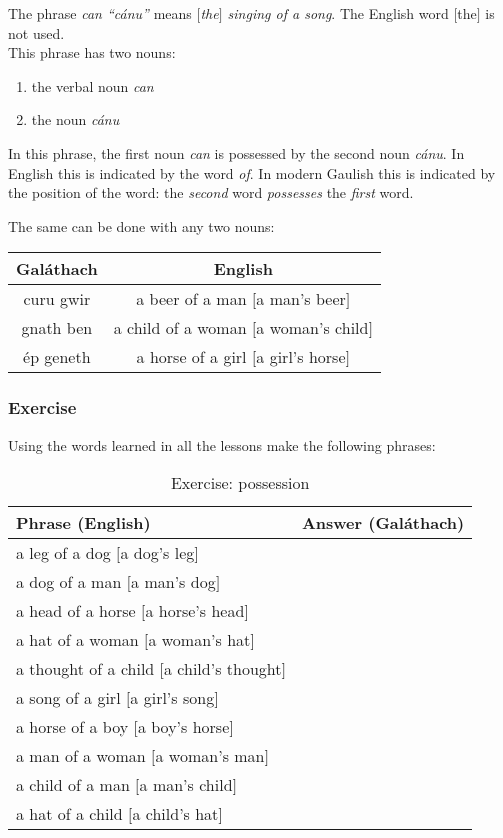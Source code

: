 The phrase \textit{can ``c\'{a}nu''} means \textit{$[$the$]$ singing of a song}. The English word $[$the$]$ is not used.\\

This phrase has two nouns:
\begin{enumerate}
 \item{the verbal noun \textit{can}}
 \item{the noun \textit{c\'{a}nu}}
\end{enumerate}
In this phrase, the first noun \textit{can} is possessed by the second noun \textit{c\'{a}nu}. In English this is indicated by the word \textit{of}. In modern Gaulish this is indicated by the position of the word: the \textit{second} word \textit{possesses} the \textit{first} word.

The same can be done with any two nouns:
\begin{table}[H]
\centering
\begin{tabu}{c|c}
  \textbf{Gal\'{a}thach} & \textbf{English}\\
  \toprule
  curu gwir & a beer of a man $[$a man's beer$]$\\
  gnath ben & a child of a woman $[$a woman's child$]$\\
  \'{e}p geneth & a horse of a girl $[$a girl's horse$]$
\end{tabu}
\label{examples_possession_word_position}
\end{table}

\newpage
\subsubsection{Exercise}

Using the words learned in all the lessons make the following phrases:
\begin{table}[H]
\centering
\begin{tabu}{|l|p{10.0cm}|}
  \toprule
  \textbf{Phrase (English)} & \textbf{Answer (Gal\'{a}thach)}\\
  \toprule
  a leg of a dog $[$a dog's leg$]$ & \\
  \midrule
  a dog of a man $[$a man's dog$]$ & \\
  \midrule
  a head of a horse $[$a horse's head$]$ & \\
  \midrule
  a hat of a woman $[$a woman's hat$]$ & \\
  \midrule
  a thought of a child $[$a child's thought$]$ & \\
  \midrule
  a song of a girl $[$a girl's song$]$ & \\
  \midrule
  a horse of a boy $[$a boy's horse$]$ & \\
  \midrule
  a man of a woman $[$a woman's man$]$ & \\
  \midrule
  a child of a man $[$a man's child$]$ & \\
  \midrule
  a hat of a child $[$a child's hat$]$ & \\
  \bottomrule
\end{tabu}
\label{exercise_possession}
\caption{Exercise: possession}
\end{table}


